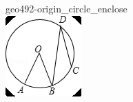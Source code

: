 \documentclass[12pt]{article}
\begin{document}
\begin{center}
\begin{minipage}{0.32\textwidth}
\end{minipage}
\hfill\begin{minipage}{0.32\textwidth}\centering
geo492-origin\_circle\_enclose\\
\includegraphics[width=0.95\linewidth]{out_rommath_origin/items/geo492-origin/assets/figure_circle.png}
\end{minipage}
\par
\end{center}
\bigskip
\end{document}
